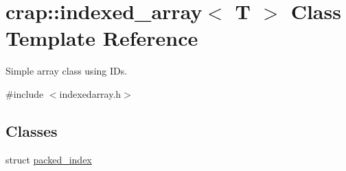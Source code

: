 \hypertarget{classcrap_1_1indexed__array}{\section{crap\+:\+:indexed\+\_\+array$<$ T $>$ Class Template Reference}
\label{classcrap_1_1indexed__array}
}


Simple array class using I\+Ds.  




{\ttfamily \#include $<$indexedarray.\+h$>$}

\subsection*{Classes}
\begin{DoxyCompactItemize}
\item 
struct \hyperlink{structcrap_1_1indexed__array_1_1packed__index}{packed\+\_\+index}
\end{DoxyCompactItemize}
